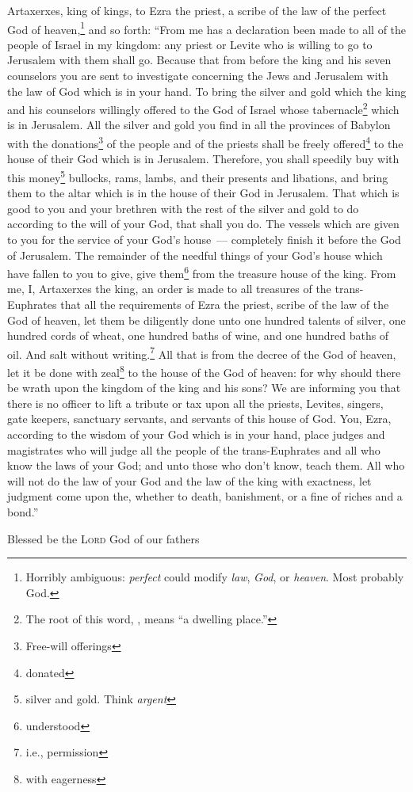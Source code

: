\begin{inparaenum}
     Artaxerxes, king of kings, to Ezra the priest, a scribe of the law of the perfect God of heaven,\footnote{Horribly ambiguous: \textit{perfect} could modify \textit{law}, \textit{God}, or \textit{heaven}. Most probably God.} and so forth:%
     ``From me has a declaration been made to all of the people of Israel in my kingdom: any priest or Levite who is willing to go to Jerusalem with them shall go.%
     Because that from before the king and his seven counselors you are sent to investigate concerning the Jews and Jerusalem with the law of God which is in your hand.%
     To bring the silver and gold which the king and his counselors willingly offered to the God of Israel whose tabernacle\footnote{The root of this word, , means ``a dwelling place.''} which is in Jerusalem.%
     All the silver and gold you find in all the provinces of Babylon with the donations\footnote{Free-will offerings} of the people and of the priests shall be freely offered\footnote{donated} to the house of their God which is in Jerusalem.%
     Therefore, you shall speedily buy with this money\footnote{silver and gold. Think \textit{argent}} bullocks, rams, lambs, and their presents and libations, and bring them to the altar which is in the house of their God in Jerusalem.%
     That which is good to you and your brethren with the rest of the silver and gold to do according to the will of your God, that shall you do.%
     The vessels which are given to you for the service of your God's house~--- completely finish it before the God of Jerusalem.%
     The remainder of the needful things of your God's house which have fallen to you to give, give them\footnote{understood} from the treasure house of the king.%
     From me, I, Artaxerxes the king, an order is made to all treasures of the trans-Euphrates that all the requirements of Ezra the priest, scribe of the law of the God of heaven, let them be diligently done%
     unto one hundred talents of silver, one hundred cords of wheat, one hundred baths of wine, and one hundred baths of oil. And salt without writing.\footnote{i.e., permission}%
     All that is from the decree of the God of heaven, let it be done with zeal\footnote{with eagerness} to the house of the God of heaven: for why should there be wrath upon the kingdom of the king and his sons?%
     We are informing you that there is no officer to lift a tribute or tax upon all the priests, Levites, singers, gate keepers, sanctuary servants, and servants of this house of God.%
     You, Ezra, according to the wisdom of your God which is in your hand, place judges and magistrates who will judge all the people of the trans-Euphrates and all who know the laws of your God; and unto those who don't know, teach them.%
     All who will not do the law of your God and the law of the king with exactness, let judgment come upon the, whether to death, banishment, or a fine of riches and a bond.''%
    
     Blessed be the \textsc{Lord} God of our fathers%
\end{inparaenum}
